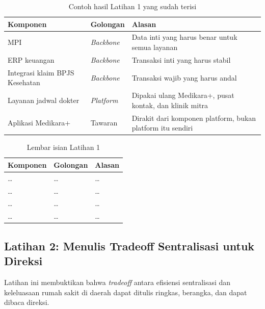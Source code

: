 \begin{table}[!htb]
  \centering
  \caption{Contoh hasil Latihan 1 yang sudah terisi}
  \label{tab:ch08-lat1-contoh}
  \begin{tabularx}{\textwidth}{>{\raggedright\arraybackslash}p{3.4cm}l>{\raggedright\arraybackslash}X}
    \hline
    \textbf{Komponen} & \textbf{Golongan} & \textbf{Alasan} \\
    \hline
    MPI & \textit{Backbone} & Data inti yang harus benar untuk semua layanan \\
    \hline
    ERP keuangan & \textit{Backbone} & Transaksi inti yang harus stabil \\
    \hline
    Integrasi klaim BPJS Kesehatan & \textit{Backbone} & Transaksi wajib yang harus andal \\
    \hline
    Layanan jadwal dokter & \textit{Platform} & Dipakai ulang Medikara+, pusat kontak, dan
      klinik mitra \\
    \hline
    Aplikasi Medikara+ & Tawaran & Dirakit dari komponen platform, bukan platform itu
      sendiri \\
    \hline
  \end{tabularx}
\end{table}

\begin{table}[!htb]
  \centering
  \caption{Lembar isian Latihan 1}
  \label{tab:ch08-lat1-hasil}
  \begin{tabularx}{\textwidth}{>{\raggedright\arraybackslash}p{3.4cm}l>{\raggedright\arraybackslash}X}
    \hline
    \textbf{Komponen} & \textbf{Golongan} & \textbf{Alasan} \\
    \hline
    \dots & \dots & \dots \\
    \hline
    \dots & \dots & \dots \\
    \hline
    \dots & \dots & \dots \\
    \hline
    \dots & \dots & \dots \\
    \hline
  \end{tabularx}
\end{table}

\subsection*{Latihan 2: Menulis Tradeoff Sentralisasi untuk Direksi}

Latihan ini membuktikan bahwa \textit{tradeoff} antara efisiensi sentralisasi dan
keleluasaan rumah sakit di daerah dapat ditulis ringkas, berangka, dan dapat dibaca direksi.

